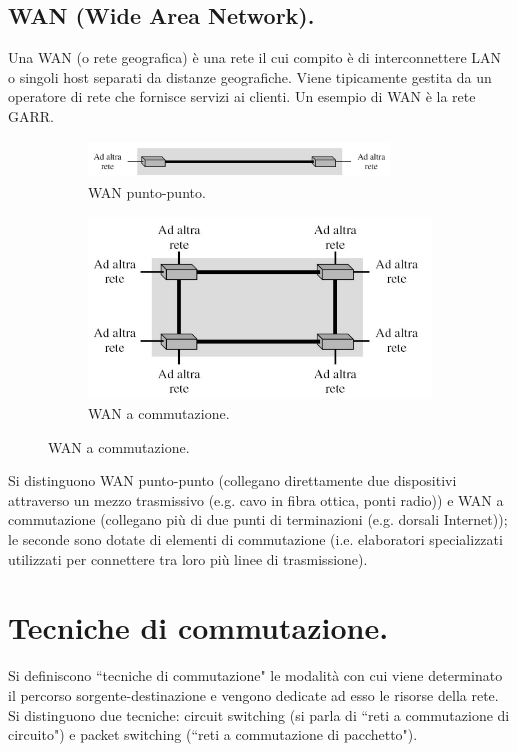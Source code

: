 \documentclass[11pt, italian, openany]{book}
\begin{document}
\begin{sloppypar}
\subsection*{WAN (Wide Area Network).}
Una WAN (o rete geografica) \`e una rete il cui compito \`e di interconnettere LAN o singoli host separati da distanze geografiche. Viene
tipicamente gestita da un operatore di rete che fornisce servizi ai clienti. Un esempio di WAN \`e la rete GARR.

\begin{figure}[h!]
	\begin{subfigure}{0.49 \linewidth} \centering
		\includegraphics[width=80mm,height=10mm]{images/wan-puntopunto.png}
		\caption{WAN punto-punto.}
	\end{subfigure}
	\begin{subfigure}{0.49 \linewidth} \centering
		\includegraphics[scale=0.25]{images/wan-commutazione.png}
		\caption{WAN a commutazione.}
	\end{subfigure}
\end{figure}

Si distinguono WAN punto-punto (collegano direttamente due dispositivi attraverso un mezzo trasmissivo (e.g. cavo in fibra ottica, ponti radio))
e WAN a commutazione (collegano pi\`u di due punti di terminazioni (e.g. dorsali Internet)); le seconde sono dotate di elementi di commutazione
(i.e. elaboratori specializzati utilizzati per connettere tra loro pi\`u linee di trasmissione).

\section{Tecniche di commutazione.}
Si definiscono ``tecniche di commutazione" le modalit\`a con cui viene determinato il percorso sorgente-destinazione e vengono dedicate ad esso le
risorse della rete. Si distinguono due tecniche: circuit switching (si parla di ``reti a commutazione di circuito") e packet switching (``reti a
commutazione di pacchetto").


\end{sloppypar}
\end{document}

